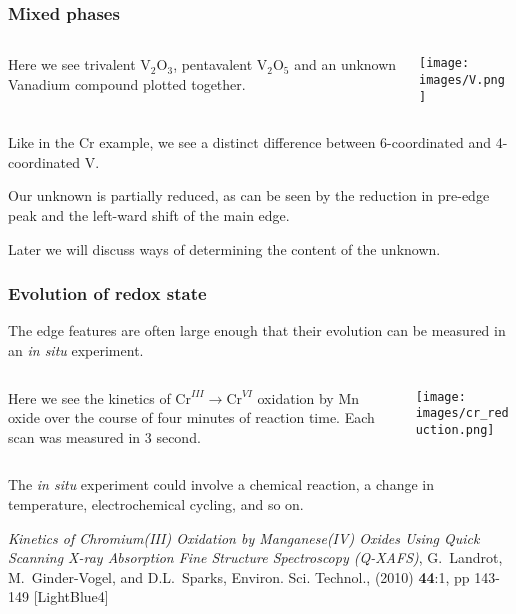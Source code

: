 \documentclass[10pt, xcolor=x11names, compress]{beamer}
\begin{document}
\begin{frame}
  \frametitle{Mixed phases}

  \begin{columns}
    \begin{column}{0.4\linewidth}
      Here we see {\color{Blue3}trivalent V$_2$O$_3$},
      {\color{Red2}pentavalent V$_2$O$_5$} and an
      {\color{Green4}unknown Vanadium compound} plotted together.
    \end{column}
    \begin{column}{0.6\linewidth}
      \texttt{[image: images/V.png]}
    \end{column}
  \end{columns}

  \bigskip
  
  Like in the Cr example, we see a distinct difference between
  6-coordinated and 4-coordinated V.

  \bigskip

  Our unknown is partially reduced, as can be seen by the reduction in
  pre-edge peak and the left-ward shift of the main edge.

  \bigskip

  Later we will discuss ways of determining the content of the
  unknown.
\end{frame}

\begin{frame}
  \frametitle{Evolution of redox state}

  The edge features are often large enough that their evolution can be
  measured in an \textit{in situ} experiment.
  \begin{columns}
    \begin{column}{0.4\linewidth}
      Here we see the kinetics of $\mathrm{Cr}^{III}\rightarrow
      \mathrm{Cr}^{VI}$ oxidation by Mn oxide over the course of four
      minutes of reaction time.  Each scan was measured in 3 second.
    \end{column}
    
    \begin{column}{0.6\linewidth}
      \texttt{[image: images/cr\_reduction.png]}
    \end{column}
  \end{columns}

  The \textit{in situ} experiment could involve a chemical reaction, a
  change in temperature, electrochemical cycling, and so on.

  \begin{bottomnote}[0.5][18.5]
    \textit{Kinetics of Chromium(III) Oxidation by Manganese(IV)
      Oxides Using Quick Scanning X-ray Absorption Fine Structure
      Spectroscopy (Q-XAFS)}, G.\ Landrot, M.\ Ginder-Vogel,
    and D.L.\ Sparks, Environ. Sci. Technol., (2010) \textbf{44}:1, pp
    143-149 [LightBlue4]
  \end{bottomnote}
\end{frame}
\end{document}
